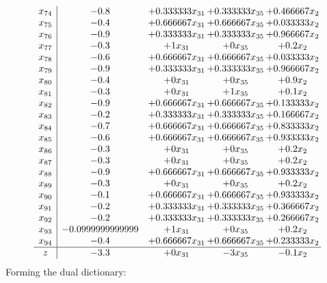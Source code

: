 \documentclass[11pt]{article}
\begin{document}
\[\begin{array}{c| c c@{\hskip 2pt} c@{\hskip 2pt} c@{\hskip 2pt} }
 x_{74}   &  -0.8 & + 0.333333 x_{31} & + 0.333333 x_{35} & + 0.466667 x_{2}\\
 x_{75}   &  -0.4 & + 0.666667 x_{31} & + 0.666667 x_{35} & + 0.033333 x_{2}\\
 x_{76}   &  -0.9 & + 0.333333 x_{31} & + 0.333333 x_{35} & + 0.966667 x_{2}\\
 x_{77}   &  -0.3 & + 1 x_{31} & + 0 x_{35} & + 0.2 x_{2}\\
 x_{78}   &  -0.6 & + 0.666667 x_{31} & + 0.666667 x_{35} & + 0.033333 x_{2}\\
 x_{79}   &  -0.9 & + 0.333333 x_{31} & + 0.333333 x_{35} & + 0.966667 x_{2}\\
 x_{80}   &  -0.4 & + 0 x_{31} & + 0 x_{35} & + 0.9 x_{2}\\
 x_{81}   &  -0.3 & + 0 x_{31} & + 1 x_{35} & + 0.1 x_{2}\\
 x_{82}   &  -0.9 & + 0.666667 x_{31} & + 0.666667 x_{35} & + 0.133333 x_{2}\\
 x_{83}   &  -0.2 & + 0.333333 x_{31} & + 0.333333 x_{35} & + 0.166667 x_{2}\\
 x_{84}   &  -0.7 & + 0.666667 x_{31} & + 0.666667 x_{35} & + 0.833333 x_{2}\\
 x_{85}   &  -0.6 & + 0.666667 x_{31} & + 0.666667 x_{35} & + 0.933333 x_{2}\\
 x_{86}   &  -0.3 & + 0 x_{31} & + 0 x_{35} & + 0.2 x_{2}\\
 x_{87}   &  -0.3 & + 0 x_{31} & + 0 x_{35} & + 0.2 x_{2}\\
 x_{88}   &  -0.9 & + 0.666667 x_{31} & + 0.666667 x_{35} & + 0.933333 x_{2}\\
 x_{89}   &  -0.3 & + 0 x_{31} & + 0 x_{35} & + 0.2 x_{2}\\
 x_{90}   &  -0.1 & + 0.666667 x_{31} & + 0.666667 x_{35} & + 0.933333 x_{2}\\
 x_{91}   &  -0.2 & + 0.333333 x_{31} & + 0.333333 x_{35} & + 0.366667 x_{2}\\
 x_{92}   &  -0.2 & + 0.333333 x_{31} & + 0.333333 x_{35} & + 0.266667 x_{2}\\
 x_{93}   &  -0.0999999999999 & + 1 x_{31} & + 0 x_{35} & + 0.2 x_{2}\\
 x_{94}   &  -0.4 & + 0.666667 x_{31} & + 0.666667 x_{35} & + 0.233333 x_{2}\\
\hline
z    &  -3.3 & + 0 x_{31} & -3 x_{35} & -0.1 x_{2}\\
\end{array}\]
Forming the dual dictionary:
\end{document}
